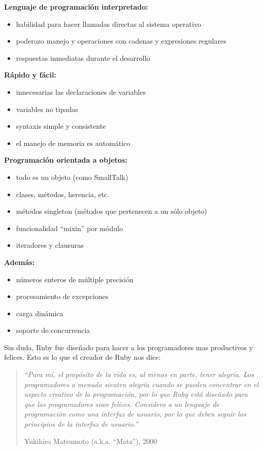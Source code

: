 \documentclass{article}
\begin{document}
\textbf{Lenguaje de programación interpretado:}
\begin{itemize}
	\itemsep=1pt \topsep=0pt \partopsep=0pt \parskip=0pt \parsep=0pt
	\item habilidad para hacer llamadas directas al sistema operativo
	\item poderozo manejo y operaciones con cadenas y expresiones regulares
	\item respuestas inmediatas durante el desarrollo
\end{itemize}
\medskip

\textbf{Rápido y fácil:}
\begin{itemize}
\itemsep=2pt \topsep=0pt \partopsep=0pt \parskip=0pt \parsep=0pt
	\item innecesarias las declaraciones de variables
	\item variables no tipadas
	\item syntaxis simple y consistente
	\item el manejo de memoria es automático
\end{itemize}
\medskip

\textbf{Programación orientada a objetos:}
\begin{itemize}
\itemsep=2pt \topsep=0pt \partopsep=0pt \parskip=0pt \parsep=0pt
	\item todo es un objeto (como SmallTalk)
	\item clases, métodos, herencia, etc.
	\item métodos singleton (métodos que pertenecen a un sólo objeto)
	\item funcionalidad ``mixin'' por módulo
	\item iteradores y clausuras
\end{itemize}
\medskip

\textbf{Además:}
\begin{itemize}
\itemsep=2pt \topsep=0pt \partopsep=0pt \parskip=0pt \parsep=0pt
	\item números enteros de múltiple precisión
	\item procesamiento de excepciones
	\item carga dinámica
	\item soporte de concurrencia
\end{itemize}
\bigskip\bigskip

Sin duda, Ruby fue diseñado para hacer a los programadores mas productivos y felices. Esto es lo que el creador de Ruby nos dice:

\begin{quotation}
\em``Para mí, el propósito de la vida es, al menos en parte, tener alegría. Los programadores a menudo sienten alegría cuando se pueden concentrar en el aspecto creativo de la programación, por lo que Ruby está diseñado para que los programadores sean felices. Considero a un lenguaje de programación como una interfaz de usuario, por lo que deben seguir los principios de la interfaz de usuario.''

\begin{flushright} Yukihiro Matsumoto (a.k.a. “Matz”), 2000 \end{flushright}
\end{quotation}
\end{document}
